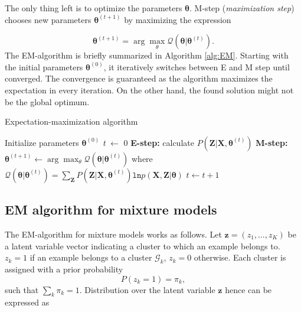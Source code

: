 The only thing left is to optimize the parameters $\boldsymbol \theta$. M-step (\textit{maximization step}) chooses new parameters $\boldsymbol \theta^{(t+1)}$ by maximizing the expression

\begin{equation}
	\boldsymbol \theta^{(t+1)} = \arg \max_{\theta}\mathcal{Q}(\boldsymbol \theta | \boldsymbol \theta^{(t)}).
\end{equation}
The EM-algorithm is briefly summarized in Algorithm \ref{alg:EM}. Starting with the initial parameters $\boldsymbol \theta^{(0)}$, it iteratively switches between E and M step until converged. The convergence is guaranteed as the algorithm maximizes the expectation in every iteration. On the other hand, the found solution might not be the global optimum. \\

\begin{algorithm}
\label{alg:EM}
\caption{Expectation-maximization algorithm}

\begin{algorithmic}[1]
 		\State Initialize parameters $\boldsymbol \theta^{(0)}$
 		\State \textit{t} $\leftarrow$ 0
 		\Repeat
 			\State \textbf{E-step:} calculate $P(\mathbf{Z} | \mathbf{X}, \boldsymbol \theta^{(t)})$
 			\State \textbf{M-step:} $\boldsymbol \theta^{(t+1)} \leftarrow \arg\max_{\theta}\mathcal{Q}(\boldsymbol \theta | \boldsymbol \theta^{(t)})$ 
 			 \Statex \quad \quad \quad \quad where $\mathcal{Q}(\boldsymbol \theta | \boldsymbol \theta^{(t)}) = \sum_{\mathbf{Z}}P(\mathbf{Z}|\mathbf{X}, \boldsymbol \theta^{(t)}) \mathtt{ln}p(\mathbf{X}, \mathbf{Z}| \boldsymbol \theta)$
 			\State $t \leftarrow t+1$
 	\EndFunction
\end{algorithmic}
\end{algorithm}





\subsection{EM algorithm for mixture models}

The EM-algorithm for mixture models works as follows. Let $\mathbf{z} = (z_1, \ldots, z_K)$ be a latent variable vector indicating a cluster to which an example belongs to. $z_k = 1$ if an example belongs to a cluster $\mathcal{G}_k$, $z_k=0$ otherwise. Each cluster is assigned with a prior probability 
$$ P(z_k = 1) = \pi_k, $$
such that $\sum_k\pi_k=1$. Distribution over the latent variable $\mathbf{z}$  hence can be expressed as 


